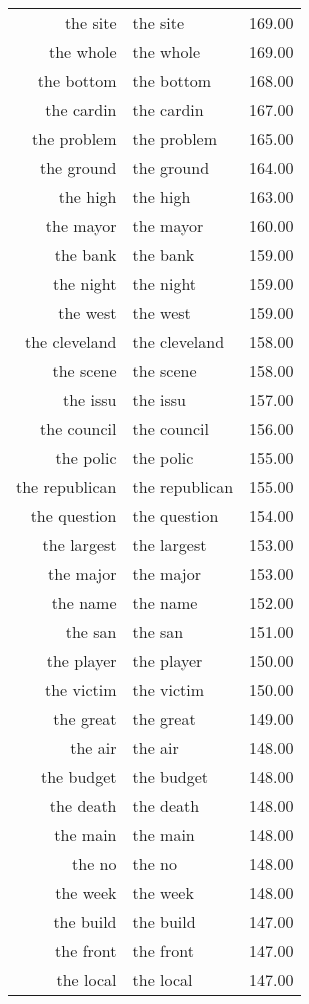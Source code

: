 \begin{table}[ht]
\begin{tabular}{rlr}
  the site & the site & 169.00 \\ 
  the whole & the whole & 169.00 \\ 
  the bottom & the bottom & 168.00 \\ 
  the cardin & the cardin & 167.00 \\ 
  the problem & the problem & 165.00 \\ 
  the ground & the ground & 164.00 \\ 
  the high & the high & 163.00 \\ 
  the mayor & the mayor & 160.00 \\ 
  the bank & the bank & 159.00 \\ 
  the night & the night & 159.00 \\ 
  the west & the west & 159.00 \\ 
  the cleveland & the cleveland & 158.00 \\ 
  the scene & the scene & 158.00 \\ 
  the issu & the issu & 157.00 \\ 
  the council & the council & 156.00 \\ 
  the polic & the polic & 155.00 \\ 
  the republican & the republican & 155.00 \\ 
  the question & the question & 154.00 \\ 
  the largest & the largest & 153.00 \\ 
  the major & the major & 153.00 \\ 
  the name & the name & 152.00 \\ 
  the san & the san & 151.00 \\ 
  the player & the player & 150.00 \\ 
  the victim & the victim & 150.00 \\ 
  the great & the great & 149.00 \\ 
  the air & the air & 148.00 \\ 
  the budget & the budget & 148.00 \\ 
  the death & the death & 148.00 \\ 
  the main & the main & 148.00 \\ 
  the no & the no & 148.00 \\ 
  the week & the week & 148.00 \\ 
  the build & the build & 147.00 \\ 
  the front & the front & 147.00 \\ 
  the local & the local & 147.00 \\ 

\end{tabular}
\end{table}
